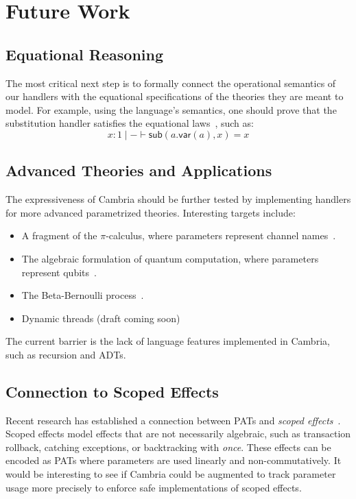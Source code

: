 \documentclass{article}
\theoremstyle{definition}
\theoremstyle{remark}
\newcommand\sub{\mathsf{sub}}
\newcommand\var{\mathsf{var}}
\begin{document}
\section{Future Work}

\subsection{Equational Reasoning}

The most critical next step is to formally connect the operational semantics of our handlers with the equational specifications of the theories they are meant to model.
For example, using the language's semantics, one should prove that the substitution handler satisfies the equational laws~\cite{fiore_substitution_2014}, such as:
\[
  x:1 \mid - \vdash \sub(a.\var(a), x) = x
\]

\subsection{Advanced Theories and Applications}

The expressiveness of Cambria should be further tested by implementing handlers for more advanced parametrized theories.
Interesting targets include:
\begin{itemize}
  \item A fragment of the $\pi$-calculus, where parameters represent channel names~\cite{staton_instances_2013}.
  \item The algebraic formulation of quantum computation, where parameters represent qubits~\cite{staton_algebraic_2015}.
  \item The Beta-Bernoulli process~\cite{staton_beta_2018}.
  \item Dynamic threads (draft coming soon)
\end{itemize}
The current barrier is the lack of language features implemented in Cambria, such as recursion and ADTs.

\subsection{Connection to Scoped Effects}

Recent research has established a connection between PATs and \emph{scoped effects}~\cite{lindley_scoped_2024}.
Scoped effects model effects that are not necessarily algebraic, such as transaction rollback, catching exceptions, or backtracking with \emph{once}.
These effects can be encoded as PATs where parameters are used linearly and non-commutatively.
It would be interesting to see if Cambria could be augmented to track parameter usage more precisely to enforce safe implementations of scoped effects.



\end{document}
